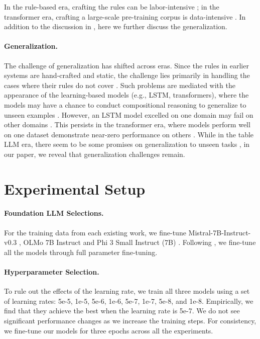 \documentclass[11pt]{article}
\begin{document}
In the rule-based era, crafting the rules can be labor-intensive \citep{warren-pereira-1982-efficient}; in the transformer era, crafting a large-scale pre-training corpus is data-intensive \citep{yin-etal-2020-tabert}.
In addition to the discussion in , here we further discuss the generalization. 

\paragraph{Generalization.}
The challenge of generalization has shifted across eras.
Since the rules in earlier systems are hand-crafted and static, the challenge lies primarily in handling the cases where their rules do not cover \citep{warren-pereira-1982-efficient}.
Such problems are mediated with the appearance of the learning-based models (e.g., LSTM, transformers), where the models may have a chance to conduct compositional reasoning to generalize to unseen examples \citep{zhong2018seqsql}.
However, an LSTM model excelled on one domain may fail on other domains \citep{yu-etal-2018-spider}.
This persists in the transformer era, where models perform well on one dataset demonstrate near-zero performance on others \citep{suhr-etal-2020-exploring}.
While in the table LLM era, there seem to be some promises on generalization to unseen tasks \citep{zhang-etal-2024-tablellama}, in our paper, we reveal that generalization challenges remain.


\section{Experimental Setup}
\label{app-sec: experimental-setup}

\paragraph{Foundation LLM Selections.}
For the training data from each existing work, we fine-tune Mistral-7B-Instruct-v0.3 \citep{jiang2023mistral}, OLMo 7B Instruct \citep{groeneveld2024olmo} and Phi 3 Small Instruct (7B) \citep{abdin2024phi}.
Following \citet{zhang-etal-2024-tablellama, zhang2024tablellm, wu2025tablebench}, we fine-tune all the models through full parameter fine-tuning.

\paragraph{Hyperparameter Selection.}
To rule out the effects of the learning rate, we train all three models using a set of learning rates: 5e-5, 1e-5, 5e-6, 1e-6, 5e-7, 1e-7, 5e-8, and 1e-8.
Empirically, we find that they achieve the best when the learning rate is 5e-7.
We do not see significant performance changes as we increase the training steps.
For consistency, we fine-tune our models for three epochs across all the experiments.
\end{document}
